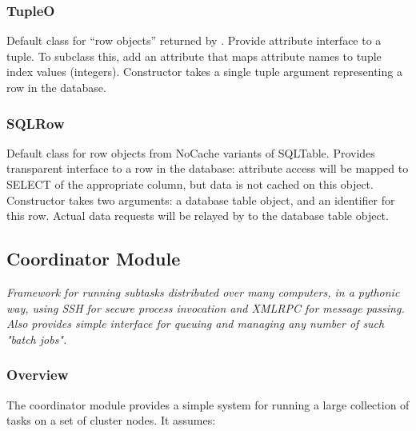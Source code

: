 \documentclass{howto}
\begin{document}
\subsubsection{TupleO}
Default class for ``row objects'' returned by .
Provide attribute interface to a tuple.  To subclass this,
add an  attribute
that maps attribute names to tuple index values (integers).
Constructor takes a single tuple argument representing a
row in the database.

\subsubsection{SQLRow}
Default class for row objects from NoCache variants of SQLTable.
Provides transparent interface to a row in the database: attribute access
will be mapped to SELECT of the appropriate column, but data is not cached
on this object.  Constructor takes two arguments: a database table
object, and an identifier for this row.  Actual data requests will
be relayed by  to the database table object.

\subsection{Coordinator Module}
\label{coord-module}

{\em Framework for running subtasks distributed over many computers, in a pythonic way, using SSH for secure process invocation and XMLRPC for message passing. Also provides simple interface for queuing and managing any number of such "batch jobs".}

\subsubsection{Overview}

The coordinator module provides a simple system for running a large collection of tasks on a set of cluster nodes.  It assumes:
\end{document}
